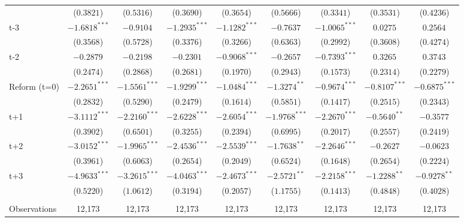 \begin{landscape}
\begin{table}[htbp]
{\begin{tabular}{lcccccccc}
&     ($0.3821$) &     ($0.5316$) & ($0.3690$)& ($ 0.3654$)  &    ($0.5666$)   &   ($0.3341$) &    ($0.3531$)   &   ($0.4236$) \\
t-3 &     $ -1.6818^{***} $ &     $ -0.9104^{} $ &  $ -1.2935^{***} $  &  $ -1.1282^{***} $  &     $ -0.7637^{} $ &     $ -1.0065^{***} $ & $ 0.0275^{} $ & $ 0.2564^{} $   \\
&     ($0.3568$) &     ($0.5728$) & ($0.3376$)& ($ 0.3266$)  &    ($0.6363$)   &   ($0.2992$) &    ($0.3608$)   &   ($0.4274$) \\
t-2 &     $ -0.2879^{} $ &     $ -0.2198^{} $ &  $ -0.2301^{} $  &  $ -0.9068^{***} $  &     $ -0.2657^{} $ &     $ -0.7393^{***} $ & $ 0.3265^{} $ & $ 0.3743^{} $   \\
&     ($0.2474$) &     ($0.2868$) & ($0.2681$)& ($ 0.1970$)  &    ($0.2943$)   &   ($0.1573$) &    ($0.2314$)   &   ($0.2279$) \\
Reform (t=0) &     $ -2.2651^{***} $ &     $ -1.5561^{***} $ &   $ -1.9299^{***} $   &   $ -1.0484^{***} $  &     $ -1.3274^{**} $ &     $ -0.9674^{***} $ & $ -0.8107^{***} $ & $ -0.6875^{***} $   \\
&     ($0.2832$) &     ($0.5290$) & ($0.2479$)& ($ 0.1614$)  &    ($0.5851$)   &   ($0.1417$) &    ($0.2515$)   &   ($0.2343$) \\
t+1 &     $ -3.1112^{***} $ &     $ -2.2160^{***} $ &    $ -2.6228^{***} $ &    $ -2.6054^{***} $ &     $ -1.9768^{***} $ &     $ -2.2670^{***} $  & $ -0.5640^{**} $ & $ -0.3577^{} $   \\
&     ($0.3902$) &     ($0.6501$) & ($0.3255$)& ($ 0.2394$)  &    ($0.6995$)   &   ($0.2017$) &    ($0.2557$)   &   ($0.2419$) \\
t+2 &     $ -3.0152^{***} $ &     $ -1.9965^{***} $ &    $ -2.4536^{***} $ &    $ -2.5539^{***} $ &     $ -1.7638^{**} $ &     $ -2.2646^{***} $  & $ -0.2627^{} $ & $ -0.0623^{} $   \\
&     ($0.3961$) &     ($0.6063$) & ($0.2654$)& ($ 0.2049$)  &    ($0.6524$)   &   ($0.1648$) &    ($0.2654$)   &   ($0.2224$) \\
t+3 &     $ -4.9633^{***} $ &     $ -3.2615^{***} $ &    $ -4.0463^{***} $ &    $ -2.4673^{***} $ &     $ -2.5721^{**} $ &     $ -2.2158^{***} $  & $ -1.2288^{**} $ & $ -0.9278^{**} $   \\
&     ($0.5220$) &     ($1.0612$) & ($0.3194$)& ($ 0.2057$)  &    ($1.1755$)   &   ($0.1413$) &    ($0.4848$)   &   ($0.4028$) \\
\\
\addlinespace
Observations       &             12,173    &             12,173    &          12,173      &          12,173  &             12,173    &             12,173  &             12,173    &             12,173   \\

\end{tabular}}
\end{table}
\end{landscape}
